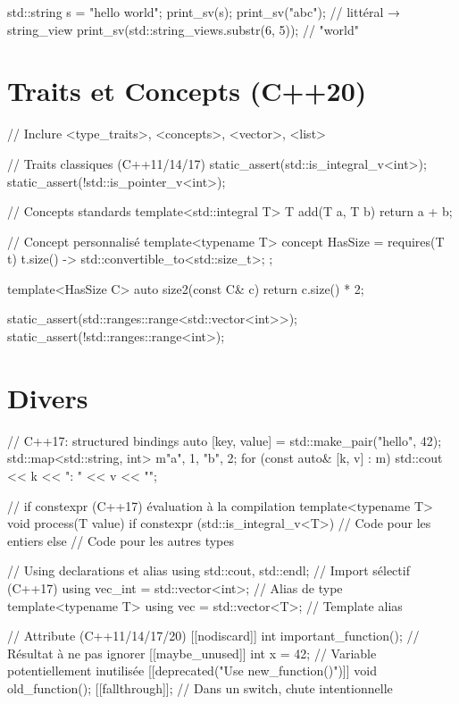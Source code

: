 \documentclass{article}
\begin{document}
\begin{multicols*}{4}
\begin{cppcode}
std::string s = "hello world";
print_sv(s);
print_sv("abc");                  // littéral → string_view
print_sv(std::string_view{s}.substr(6, 5)); // "world"
\end{cppcode}

\section*{Traits et Concepts (C++20)}

\begin{cppcode}
// Inclure <type_traits>, <concepts>, <vector>, <list>

// Traits classiques (C++11/14/17)
static_assert(std::is_integral_v<int>);
static_assert(!std::is_pointer_v<int>);

// Concepts standards
template<std::integral T>
T add(T a, T b) { return a + b; }

// Concept personnalisé
template<typename T>
concept HasSize = requires(T t) {
    { t.size() } -> std::convertible_to<std::size_t>;
};

template<HasSize C>
auto size2(const C& c) { return c.size() * 2; }

static_assert(std::ranges::range<std::vector<int>>);
static_assert(!std::ranges::range<int>);
\end{cppcode}

\section*{Divers}

\begin{cppcode}
// C++17: structured bindings
auto [key, value] = std::make_pair("hello", 42);
std::map<std::string, int> m{{"a", 1}, {"b", 2}};
for (const auto& [k, v] : m) {
    std::cout << k << ": " << v << "\n";
}

// if constexpr (C++17) évaluation à la compilation
template<typename T>
void process(T value) {
    if constexpr (std::is_integral_v<T>) {
        // Code pour les entiers
    } else {
        // Code pour les autres types
    }
}

// Using declarations et alias
using std::cout, std::endl; // Import sélectif (C++17)
using vec_int = std::vector<int>; // Alias de type
template<typename T>
using vec = std::vector<T>; // Template alias

// Attribute (C++11/14/17/20)
[[nodiscard]] int important_function(); // Résultat à ne pas ignorer
[[maybe_unused]] int x = 42;           // Variable potentiellement inutilisée
[[deprecated("Use new_function()")]] void old_function();
[[fallthrough]]; // Dans un switch, chute intentionnelle
\end{cppcode}


\end{multicols*}
\end{document}
